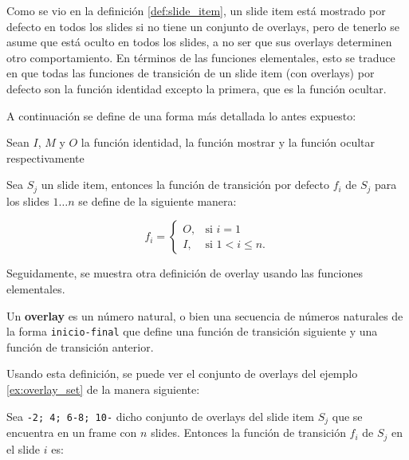 		Como se vio en la definición \ref{def:slide_item}, un slide item está mostrado por defecto en todos los slides si no tiene un conjunto de overlays, pero de tenerlo se asume que está oculto en todos los slides, a no ser que sus overlays determinen otro comportamiento. En términos de las funciones elementales, esto se traduce en que todas las funciones de transición de un slide item (con overlays) por defecto son la función identidad excepto la primera, que es la función ocultar. 

		A continuación se define de una forma más detallada lo antes expuesto:

 		Sean \( I \), \( M \) y \( O \) la función identidad, la función mostrar y la función ocultar respectivamente


        Sea \( S_j \) un slide item, entonces la función de transición por defecto \( f_i \) de \( S_j \) para los slides \( 1 \dots n \) se define de la siguiente manera:


		\begin{equation}
		\label{eq:default}
			f_i = 
			\begin{cases}
				O, & \mbox{si }i = 1 \\
				I, & \mbox{si }1 < i \leq n.
			\end{cases}
		\end{equation}

		Seguidamente, se muestra otra definición de overlay usando las funciones elementales.

		\begin{definition}
		\label{def:new_overlay}

 			Un \textbf{overlay} es un número natural, o bien una secuencia de números naturales de la forma \texttt{inicio-final} que define una función de transición siguiente y una función de transición anterior.

		\end{definition}

		Usando esta definición, se puede ver el conjunto de overlays del ejemplo \ref{ex:overlay_set} de la manera siguiente:


		Sea \texttt{-2; 4; 6-8; 10-} dicho conjunto de overlays del slide item \( S_j \) que se encuentra en un frame con \( n \) slides. Entonces la función de transición \( f_i \) de \( S_j \) en el slide \( i \) es:

